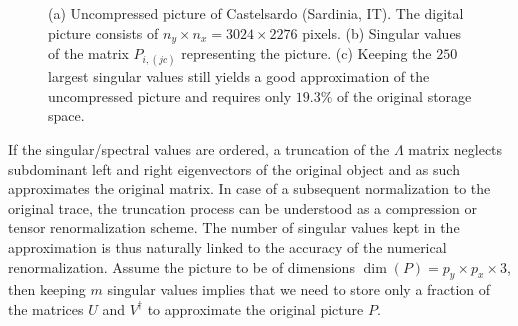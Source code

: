 \begin{figure}
    \hfil
    \caption{(a) Uncompressed picture of Castelsardo (Sardinia, IT).
    The digital picture consists of $n_y\times n_x=3024\times2276$ pixels. (b) Singular values of the matrix $P_{i,(jc)}$ representing the picture. (c) Keeping the $250$ largest singular values still yields a good approximation of the uncompressed picture and requires only $19.3\%$ of the original storage space.}
    \label{fig:svd_image_compression}
\end{figure}
If the singular/spectral values are ordered, a truncation of the $\Lambda$ matrix neglects subdominant left and right eigenvectors of the original object and as such approximates the original matrix.
In case of a subsequent normalization to the original trace, the truncation process can be understood as a compression or tensor renormalization scheme.
The number of singular values kept in the approximation is thus naturally linked to the accuracy of the numerical renormalization.
Assume the picture to be of dimensions $\dim(P)=p_y\times p_x\times 3$, then keeping $m$ singular values implies that we need to store only a fraction of the matrices $U$ and $V^\dag$ to approximate the original picture $P$.
